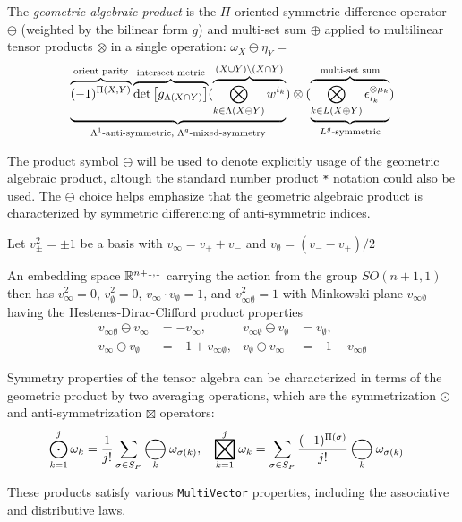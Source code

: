 \documentclass{juliacon}
\DeclareMathOperator*{\bigboxtimes}{\scalerel*{\boxtimes}{\bigodot}}
\DeclareMathOperator*{\bigominus}{\scalerel*{\ominus}{\bigodot}}
\begin{document}
\begin{definition}
	The \textit{geometric algebraic product} is the $\Pi$ oriented symmetric difference operator $\ominus$ (weighted by the bilinear form $g$) and multi-set sum $\oplus$ applied to multilinear tensor products $\otimes$ in a single operation:
	$ \omega_X\ominus \eta_Y = $
	$$\ub{\text{$\Lambda^1$-anti-symmetric, $\Lambda^g$-mixed-symmetry}}{\ob{\text{orient parity}}{(-1)^{\Pi(X,Y)}}\ob{\text{intersect metric}}{\det\mat{g_{\Lambda(X\cap Y)}}} (\ob{(X\cup Y)\bs(X\cap Y)}{\bigotimes_{k\in \Lambda(X\ominus Y)} w^{i_k}}})\otimes (\ub{\text{$L^g$-symmetric}}{\ob{\text{multi-set sum}}{\bigotimes_{k\in L(X\oplus Y)} \epsilon_{i_k}^{\otimes\mu_k}}})$$
\end{definition}

\begin{remark}
	The product symbol $\ominus$ will be used to denote explicitly usage of the geometric algebraic product, altough the standard number product \verb`*` notation could also be used.
	The $\ominus$ choice helps emphasize that the geometric algebraic product is characterized by symmetric differencing of anti-symmetric indices.
\end{remark}

\begin{definition}
	Let $v_\pm^2 = \pm1$ be a basis with $v_\infty = v_++v_-$ and $v_\emptyset = (v_--v_+)/2$
\end{definition}
An embedding space $\mb R^{n+1,1}$ carrying the action from the group $SO(n+1,1)$ then has
$v_\infty^2 =0$, $v_\emptyset^2 =0$,
$v_\infty \cdot v_\emptyset = 1$,  and $v_{\infty\emptyset}^2 = 1$ with
Minkowski plane $v_{\infty\emptyset}$ having the Hestenes-Dirac-Clifford product properties
\begin{align*}
	v_{\infty\emptyset}\ominus v_\infty &= -v_\infty, &  v_{\infty\emptyset}\ominus v_\emptyset &= v_\emptyset, \\
	v_\infty\ominus v_\emptyset &= -1 + v_{\infty\emptyset}, & v_\emptyset\ominus v_\infty &=  -1 - v_{\infty\emptyset}
\end{align*}

\begin{definition}
	Symmetry properties of the tensor algebra can be characterized in terms of the geometric product by two averaging operations, which are the symmetrization $\odot$ and anti-symmetrization $\boxtimes$ operators:
	\begin{align*}
		\bigodot_{k=1}^j \omega_k &= \frac1{j!}\sum_{\sigma\in S_P}\bigominus_k\omega_{\sigma(k)}, &
		\bigboxtimes_{k=1}^j \omega_k &= \sum_{\sigma\in S_P}\frac{(-1)^{\Pi(\sigma)}}{j!}\bigominus_k\omega_{\sigma(k)}
	\end{align*}
\end{definition}
These products satisfy various \verb`MultiVector` properties, including the associative and distributive laws.
\end{document}

